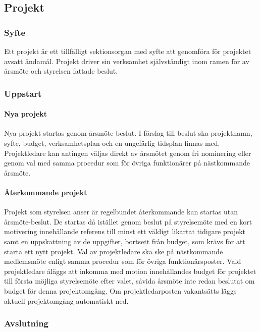 \documentclass{../resources/dgovdoc}
\begin{document}
\subsection{Projekt}

\subsubsection{Syfte}

Ett projekt är ett tillfälligt sektionsorgan med syfte att genomföra för
projektet avsatt ändamål. Projekt driver sin verksamhet självständigt inom
ramen för av årsmöte och styrelsen fattade beslut.

\subsubsection{Uppstart}

\paragraph{Nya projekt}

Nya projekt startas genom årsmöte-beslut. I förslag till beslut ska projektnamn,
syfte, budget, verksamhetsplan och en ungefärlig tidsplan finnas med.
Projektledare kan antingen väljas direkt av årsmötet genom fri nominering
eller genom val med samma procedur som för övriga funktionärer på
nästkommande årsmöte.

\paragraph{Återkommande projekt}

Projekt som styrelsen anser är regelbundet återkommande kan startas
utan årsmöte-beslut. De startas då istället genom beslut på styrelsemöte med en kort
motivering innehållande referens till minst ett väldigt likartat tidigare
projekt samt en uppskattning av de uppgifter, bortsett från budget, som krävs
för att starta ett nytt projekt. Val av projektledare ska ske på nästkommande
medlemsmöte enligt samma procedur som för övriga funktionärsposter. Vald projektledare
åläggs att inkomma med motion innehållandes budget för projektet till första
möjliga styrelsemöte efter valet, såvida årsmöte inte redan beslutat om budget för denna
projektomgång. Om projektledarposten vakantsätts läggs aktuell projektomgång
automatiskt ned.

\subsubsection{Avslutning}
\end{document}
